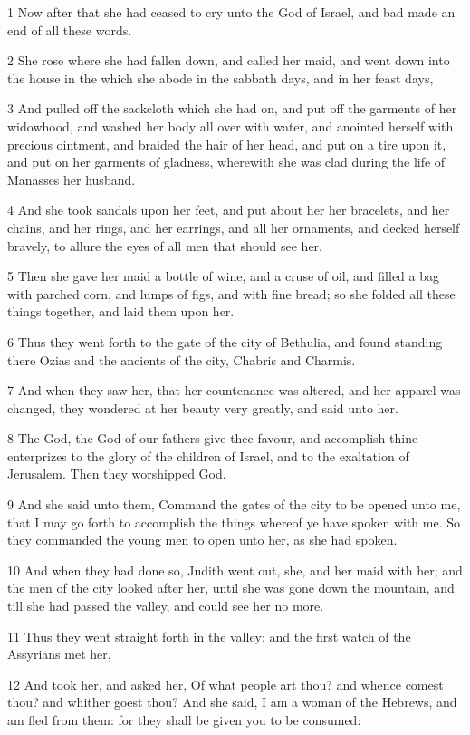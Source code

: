 \par 1 Now after that she had ceased to cry unto the God of Israel, and bad made an end of all these words.
\par 2 She rose where she had fallen down, and called her maid, and went down into the house in the which she abode in the sabbath days, and in her feast days,
\par 3 And pulled off the sackcloth which she had on, and put off the garments of her widowhood, and washed her body all over with water, and anointed herself with precious ointment, and braided the hair of her head, and put on a tire upon it, and put on her garments of gladness, wherewith she was clad during the life of Manasses her husband.
\par 4 And she took sandals upon her feet, and put about her her bracelets, and her chains, and her rings, and her earrings, and all her ornaments, and decked herself bravely, to allure the eyes of all men that should see her.
\par 5 Then she gave her maid a bottle of wine, and a cruse of oil, and filled a bag with parched corn, and lumps of figs, and with fine bread; so she folded all these things together, and laid them upon her.
\par 6 Thus they went forth to the gate of the city of Bethulia, and found standing there Ozias and the ancients of the city, Chabris and Charmis.
\par 7 And when they saw her, that her countenance was altered, and her apparel was changed, they wondered at her beauty very greatly, and said unto her.
\par 8 The God, the God of our fathers give thee favour, and accomplish thine enterprizes to the glory of the children of Israel, and to the exaltation of Jerusalem. Then they worshipped God.
\par 9 And she said unto them, Command the gates of the city to be opened unto me, that I may go forth to accomplish the things whereof ye have spoken with me. So they commanded the young men to open unto her, as she had spoken.
\par 10 And when they had done so, Judith went out, she, and her maid with her; and the men of the city looked after her, until she was gone down the mountain, and till she had passed the valley, and could see her no more.
\par 11 Thus they went straight forth in the valley: and the first watch of the Assyrians met her,
\par 12 And took her, and asked her, Of what people art thou? and whence comest thou? and whither goest thou? And she said, I am a woman of the Hebrews, and am fled from them: for they shall be given you to be consumed:
